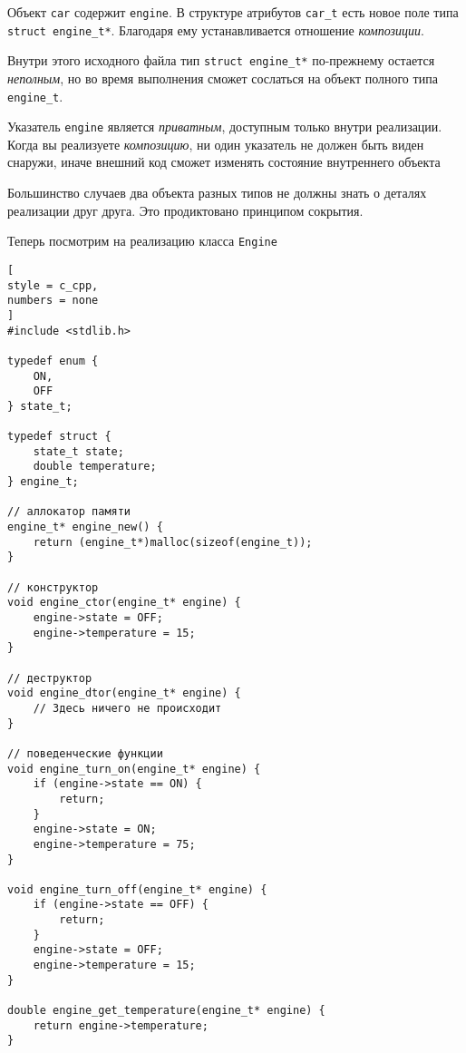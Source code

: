 \documentclass[%
	11pt,
	a4paper,
	utf8,
		]{article}
\begin{document}
Объект \verb|car| содержит \verb|engine|. В структуре атрибутов \verb|car_t| есть новое поле типа \verb|struct engine_t*|. Благодаря ему устанавливается отношение \emph{композиции}.

Внутри этого исходного файла тип \verb|struct engine_t*| по-прежнему остается \emph{неполным}, но во время выполнения сможет сослаться на объект полного типа \verb|engine_t|.

Указатель \verb|engine| является \emph{приватным}, доступным только внутри реализации. {\color{blue}Когда вы реализуете \emph{композицию}, ни один указатель не должен быть виден снаружи, иначе внешний код сможет изменять состояние внутреннего объекта} \cite[]{amini-extreme-c:2022}

Большинство случаев два объекта разных типов не должны знать о деталях реализации друг друга. Это продиктовано принципом сокрытия.

Теперь посмотрим на реализацию класса \verb|Engine|
\begin{lstlisting}[
style = c_cpp,
numbers = none
]
#include <stdlib.h>

typedef enum {
    ON,
    OFF
} state_t;

typedef struct {
    state_t state;
    double temperature;
} engine_t;

// аллокатор памяти
engine_t* engine_new() {
    return (engine_t*)malloc(sizeof(engine_t));
}

// конструктор
void engine_ctor(engine_t* engine) {
    engine->state = OFF;
    engine->temperature = 15;
}

// деструктор
void engine_dtor(engine_t* engine) {
    // Здесь ничего не происходит
}

// поведенческие функции
void engine_turn_on(engine_t* engine) {
    if (engine->state == ON) {
        return;
    }
    engine->state = ON;
    engine->temperature = 75;
}

void engine_turn_off(engine_t* engine) {
    if (engine->state == OFF) {
        return;
    }
    engine->state = OFF;
    engine->temperature = 15;
}

double engine_get_temperature(engine_t* engine) {
    return engine->temperature;
}
\end{lstlisting}
\end{document}
